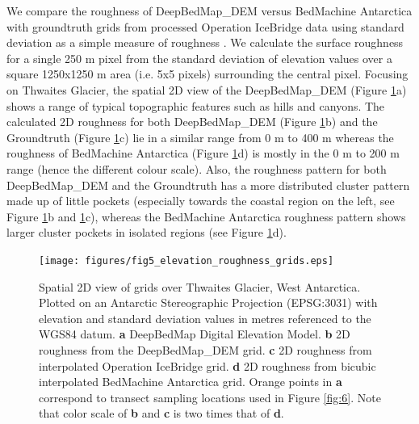 \documentclass[tc, manuscript]{copernicus}
\begin{document}
We compare the roughness of DeepBedMap\_DEM versus BedMachine Antarctica with groundtruth grids from processed Operation IceBridge data \citep{ShiMultichannelCoherentRadar2010} using standard deviation as a simple measure of roughness \citep{RippinBasalroughnessInstitute2014}.
We calculate the surface roughness for a single 250 m pixel from the standard deviation of elevation values over a square 1250x1250 m area (i.e. 5x5 pixels) surrounding the central pixel.
Focusing on Thwaites Glacier, the spatial 2D view of the DeepBedMap\_DEM (Figure \ref{fig:5}a) shows a range of typical topographic features such as hills and canyons.
The calculated 2D roughness for both DeepBedMap\_DEM (Figure \ref{fig:5}b) and the Groundtruth (Figure \ref{fig:5}c) lie in a similar range from 0 m to 400 m whereas the roughness of BedMachine Antarctica (Figure \ref{fig:5}d) is mostly in the 0 m to 200 m range (hence the different colour scale).
Also, the roughness pattern for both DeepBedMap\_DEM and the Groundtruth has a more distributed cluster pattern made up of little pockets (especially towards the coastal region on the left, see Figure \ref{fig:5}b and \ref{fig:5}c), whereas the BedMachine Antarctica roughness pattern shows larger cluster pockets in isolated regions (see Figure \ref{fig:5}d).

\begin{figure}[htbp]
  \texttt{[image: figures/fig5\_elevation\_roughness\_grids.eps]}
  \caption{
    Spatial 2D view of grids over Thwaites Glacier, West Antarctica.
    Plotted on an Antarctic Stereographic Projection (EPSG:3031) with elevation and standard deviation values in metres referenced to the WGS84 datum.
    \textbf{a} DeepBedMap Digital Elevation Model.
    \textbf{b} 2D roughness from the DeepBedMap\_DEM grid.
    \textbf{c} 2D roughness from interpolated Operation IceBridge grid.
    \textbf{d} 2D roughness from bicubic interpolated BedMachine Antarctica grid.
    Orange points in \textbf{a} correspond to transect sampling locations used in Figure \ref{fig:6}.
    Note that color scale of \textbf{b} and \textbf{c} is two times that of \textbf{d}.
  }
  \label{fig:5}
\end{figure}
\end{document}

